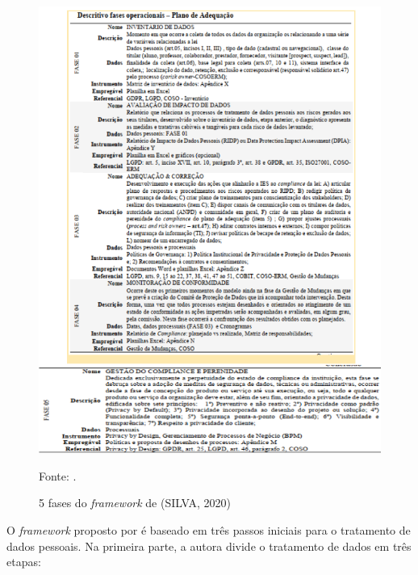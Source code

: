 \documentclass[
	12pt,				%
	openright,			%
	oneside,			%
	a4paper,			%
	english,			%
	french,				%
	spanish,			%
	brazil,				%
	]{abntex2}
\begin{document}
\begin{figure}[ht]
    \centering
    \caption{5 fases do \textit{framework} de (SILVA, 2020) }
    \includegraphics[width=6in]{Images/14Silva2020.png}
    \label{fig: silva3}
    
    \centering \small Fonte: .
\end{figure}

\pagebreak


O \textit{framework} proposto por \cite{Zini2020} é baseado em três passos iniciais para o tratamento de dados pessoais. Na primeira parte, a autora divide o tratamento de dados em três etapas:
\end{document}
